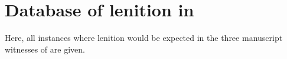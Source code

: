 \chapter{Database of lenition in }
\label{cha:datab-lenit-mwbuch}

Here, all instances where lenition would be expected in the three manuscript witnesses of are given.

